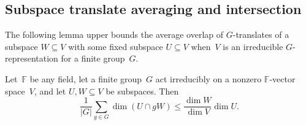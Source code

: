 \documentclass[11pt,letterpaper]{article}
\newcommand{\FF}{\mathbb{F}}
\begin{document}
\subsection{Subspace translate averaging and intersection}

The following lemma upper bounds the average overlap of $G$-translates of a subspace $W\subseteq V$ with some fixed subspace $U \subseteq V$ when~$V$ is an irreducible $G$-representation for a finite group~$G$.

\begin{lemma}\label{lem:dim-averaging}
Let~$\FF$ be any field, let a finite group~$G$ act irreducibly on a nonzero $\FF$-vector space~$V$, and let $U, W \subseteq V$ be subspaces. Then
\[
\frac{1}{|G|} \sum_{g \in G} \dim(U \cap gW) \leq \frac{\dim W}{\dim V} \dim U.
\]
\end{lemma}
\end{document}
